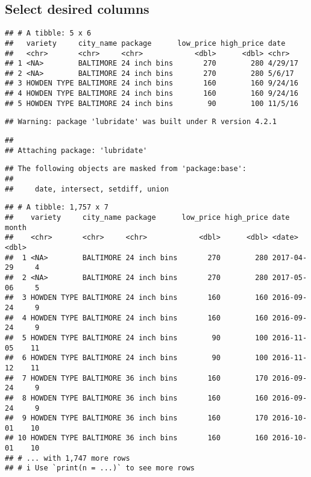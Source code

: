 \documentclass[
]{article}
\begin{document}
\hypertarget{select-desired-columns}{%
\subsection{Select desired columns}\label{select-desired-columns}}

\begin{verbatim}
## # A tibble: 5 x 6
##   variety     city_name package      low_price high_price date   
##   <chr>       <chr>     <chr>            <dbl>      <dbl> <chr>  
## 1 <NA>        BALTIMORE 24 inch bins       270        280 4/29/17
## 2 <NA>        BALTIMORE 24 inch bins       270        280 5/6/17 
## 3 HOWDEN TYPE BALTIMORE 24 inch bins       160        160 9/24/16
## 4 HOWDEN TYPE BALTIMORE 24 inch bins       160        160 9/24/16
## 5 HOWDEN TYPE BALTIMORE 24 inch bins        90        100 11/5/16
\end{verbatim}

\begin{verbatim}
## Warning: package 'lubridate' was built under R version 4.2.1
\end{verbatim}

\begin{verbatim}
## 
## Attaching package: 'lubridate'
\end{verbatim}

\begin{verbatim}
## The following objects are masked from 'package:base':
## 
##     date, intersect, setdiff, union
\end{verbatim}

\begin{verbatim}
## # A tibble: 1,757 x 7
##    variety     city_name package      low_price high_price date       month
##    <chr>       <chr>     <chr>            <dbl>      <dbl> <date>     <dbl>
##  1 <NA>        BALTIMORE 24 inch bins       270        280 2017-04-29     4
##  2 <NA>        BALTIMORE 24 inch bins       270        280 2017-05-06     5
##  3 HOWDEN TYPE BALTIMORE 24 inch bins       160        160 2016-09-24     9
##  4 HOWDEN TYPE BALTIMORE 24 inch bins       160        160 2016-09-24     9
##  5 HOWDEN TYPE BALTIMORE 24 inch bins        90        100 2016-11-05    11
##  6 HOWDEN TYPE BALTIMORE 24 inch bins        90        100 2016-11-12    11
##  7 HOWDEN TYPE BALTIMORE 36 inch bins       160        170 2016-09-24     9
##  8 HOWDEN TYPE BALTIMORE 36 inch bins       160        160 2016-09-24     9
##  9 HOWDEN TYPE BALTIMORE 36 inch bins       160        170 2016-10-01    10
## 10 HOWDEN TYPE BALTIMORE 36 inch bins       160        160 2016-10-01    10
## # ... with 1,747 more rows
## # i Use `print(n = ...)` to see more rows
\end{verbatim}
\end{document}
